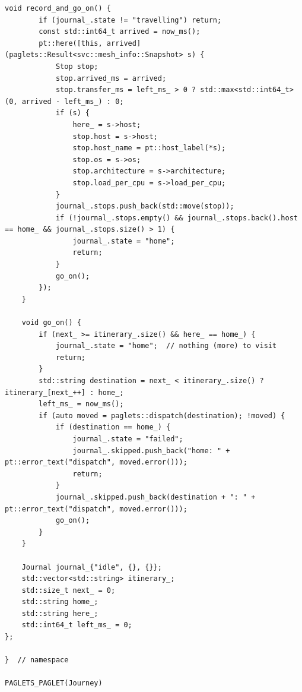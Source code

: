 \begin{lstlisting}[style=paglets-cpp,caption={The Mesh Journey \src{cpp/examples/journey/journey.cpp}},label={lst:app-journey}]
    void record_and_go_on() {
        if (journal_.state != "travelling") return;
        const std::int64_t arrived = now_ms();
        pt::here([this, arrived](paglets::Result<svc::mesh_info::Snapshot> s) {
            Stop stop;
            stop.arrived_ms = arrived;
            stop.transfer_ms = left_ms_ > 0 ? std::max<std::int64_t>(0, arrived - left_ms_) : 0;
            if (s) {
                here_ = s->host;
                stop.host = s->host;
                stop.host_name = pt::host_label(*s);
                stop.os = s->os;
                stop.architecture = s->architecture;
                stop.load_per_cpu = s->load_per_cpu;
            }
            journal_.stops.push_back(std::move(stop));
            if (!journal_.stops.empty() && journal_.stops.back().host == home_ && journal_.stops.size() > 1) {
                journal_.state = "home";
                return;
            }
            go_on();
        });
    }

    void go_on() {
        if (next_ >= itinerary_.size() && here_ == home_) {
            journal_.state = "home";  // nothing (more) to visit
            return;
        }
        std::string destination = next_ < itinerary_.size() ? itinerary_[next_++] : home_;
        left_ms_ = now_ms();
        if (auto moved = paglets::dispatch(destination); !moved) {
            if (destination == home_) {
                journal_.state = "failed";
                journal_.skipped.push_back("home: " + pt::error_text("dispatch", moved.error()));
                return;
            }
            journal_.skipped.push_back(destination + ": " + pt::error_text("dispatch", moved.error()));
            go_on();
        }
    }

    Journal journal_{"idle", {}, {}};
    std::vector<std::string> itinerary_;
    std::size_t next_ = 0;
    std::string home_;
    std::string here_;
    std::int64_t left_ms_ = 0;
};

}  // namespace

PAGLETS_PAGLET(Journey)
\end{lstlisting}

